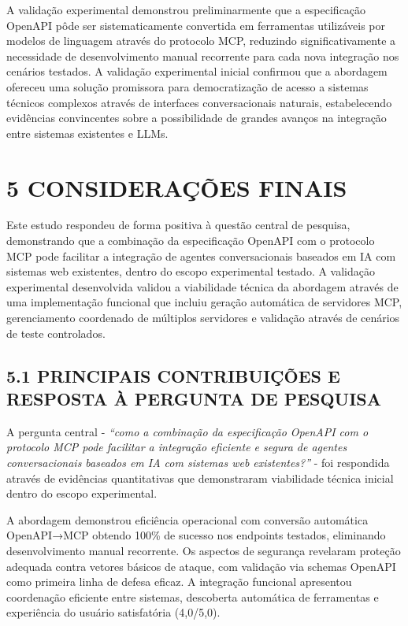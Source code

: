 \documentclass[
]{article}
\begin{document}
A validação experimental demonstrou preliminarmente que a especificação
OpenAPI pôde ser sistematicamente convertida em ferramentas utilizáveis
por modelos de linguagem através do protocolo MCP, reduzindo
significativamente a necessidade de desenvolvimento manual recorrente
para cada nova integração nos cenários testados. A validação
experimental inicial confirmou que a abordagem ofereceu uma solução
promissora para democratização de acesso a sistemas técnicos complexos
através de interfaces conversacionais naturais, estabelecendo evidências
convincentes sobre a possibilidade de grandes avanços na integração
entre sistemas existentes e LLMs.

\section{5 CONSIDERAÇÕES FINAIS}\label{considerauxe7uxf5es-finais}

Este estudo respondeu de forma positiva à questão central de pesquisa,
demonstrando que a combinação da especificação OpenAPI com o protocolo
MCP pode facilitar a integração de agentes conversacionais baseados em
IA com sistemas web existentes, dentro do escopo experimental testado. A
validação experimental desenvolvida validou a viabilidade técnica da
abordagem através de uma implementação funcional que incluiu geração
automática de servidores MCP, gerenciamento coordenado de múltiplos
servidores e validação através de cenários de teste controlados.

\subsection{5.1 PRINCIPAIS CONTRIBUIÇÕES E RESPOSTA À PERGUNTA DE
PESQUISA}\label{principais-contribuiuxe7uxf5es-e-resposta-uxe0-pergunta-de-pesquisa}

A pergunta central - \emph{``como a combinação da especificação OpenAPI
com o protocolo MCP pode facilitar a integração eficiente e segura de
agentes conversacionais baseados em IA com sistemas web existentes?''} -
foi respondida através de evidências quantitativas que demonstraram
viabilidade técnica inicial dentro do escopo experimental.

A abordagem demonstrou eficiência operacional com conversão automática
OpenAPI→MCP obtendo 100\% de sucesso nos endpoints testados, eliminando
desenvolvimento manual recorrente. Os aspectos de segurança revelaram
proteção adequada contra vetores básicos de ataque, com validação via
schemas OpenAPI como primeira linha de defesa eficaz. A integração
funcional apresentou coordenação eficiente entre sistemas, descoberta
automática de ferramentas e experiência do usuário satisfatória
(4,0/5,0).
\end{document}
